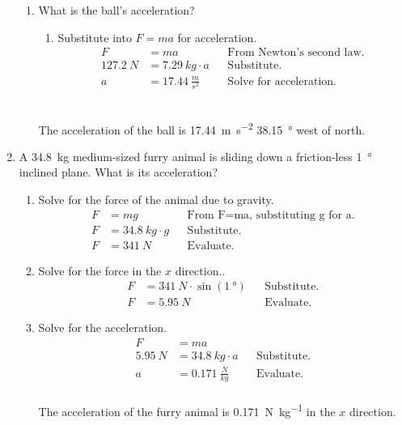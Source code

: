 \documentclass[letterpaper, 12pt]{report}
\begin{document}
\begin{enumerate}
\begin{enumerate}
            \item What is the ball's acceleration?
                \begin{enumerate}
                    \item Substitute into $F=ma$ for acceleration.
                    \begin{align}
                        F &= ma && \text{From Newton's second law.} \\
                        \SI{127.2}{N} &= \SI{7.29}{kg} \cdot a && \text{Substitute.} \\
                        a &= \SI{17.44}{\frac{m}{s^2}} && \text{Solve for acceleration.}
                    \end{align}
                \end{enumerate}
                \hfill
                    \\
                    The acceleration of the ball is \SI{17.44}{\meter\per\second\squared} \SI{38.15}{\degree} west of north. \\
        \end{enumerate}
    \item A \SI{34.8}{kg} medium-sized furry animal is sliding down a friction-less \SI{1}{\degree} inclined plane. What is its acceleration?
        \begin{enumerate}
            \item Solve for the force of the animal due to gravity.
                \begin{align}
                    F &= mg && \text{From F=ma, substituting g for a.} \\
                    F &= \SI{34.8}{kg} \cdot g && \text{Substitute.} \\
                    F &= \SI{341}{N} && \text{Evaluate.}
                \end{align}
            \item Solve for the force in the $x$ direction..
                \begin{align}
                    F &= \SI{341}{N} \cdot \sin(\SI{1}{\degree}) && \text{Substitute.} \\
                    F &= \SI{5.95}{N} && \text{Evaluate.}
                \end{align}
            \item Solve for the acceleration.
                \begin{align}
                    F &= ma && \\
                    \SI{5.95}{N} &= \SI{34.8}{kg} \cdot a && \text{Substitute.} \\
                    a &= \SI{0.171}{\frac{N}{kg}} && \text{Evaluate.}
                \end{align}
                \hfill
                    \\
                    The acceleration of the furry animal is \SI{0.171}{\newton\per\kilogram} in the $x$ direction. \\
        \end{enumerate}
        

\end{enumerate}
\end{document}
